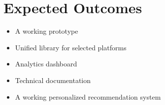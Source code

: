 \section{Expected Outcomes}
\begin{itemize}
  \item A working prototype
  \item Unified library for selected platforms
  \item Analytics dashboard
  \item Technical documentation
  \item A working personalized recommendation system
\end{itemize}
